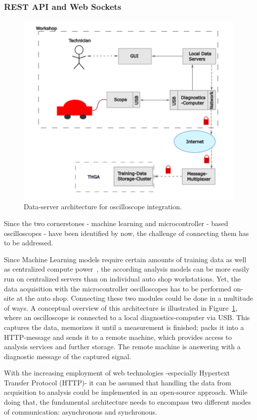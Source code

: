 \subsubsection{REST API and Web Sockets}
\begin{figure}[ht]
  \centering
  \includegraphics[width=0.9\linewidth]{figures/architecture.png}
  \caption{Data-server architecture for oscilloscope integration.}
  \label{fig:data-server}
\end{figure}
Since the two cornerstones - machine learning and microcontroller - based oscilloscopes - have been identified by now, the challenge of connecting them has to be addressed.

Since Machine Learning models require certain amounts of training data as well as centralized compute power~\cite{Verbraeken2020DMLS}, 
the according analysis models can be more easily run on centralized servers than on individual auto shop workstations. 
Yet, the data acquisition with the microcontroller oscilloscopes has to be performed on-site at the auto shop. 
Connecting these two modules could be done in a multitude of ways. 
A conceptual overview of this architecture is illustrated in Figure~\ref{fig:data-server}, where an oscilloscope is connected to a local diagnostics-computer via USB.
This captures the data, memorizes it until a measurement is finished; packs it into a HTTP-message and sends it to a remote machine, which provides access to analysis services and further storage.
The remote machine is answering with a diagnostic message of the captured signal.

With the increasing employment of web technologies -especially Hypertext Transfer Protocol (HTTP)- it can be assumed that handling the data from acquisition to analysis could be implemented in an open-source approach. 
While doing that, the fundamental architecture needs to encompass two different modes of communication: asynchronous and synchronous.

